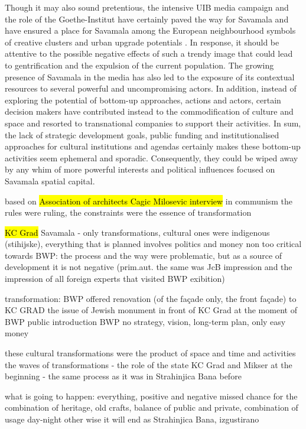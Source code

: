 \documentclass[11pt]{report}
\begin{document}
Though it may also sound pretentious, the intensive UIB media campaign  and the role of the Goethe-Institut have certainly paved the way for Savamala and have ensured a place for Savamala among the European neighbourhood symbols of creative clusters and urban upgrade potentials . In response, it should be attentive to the possible negative effects of such a trendy image that could lead to gentrification and the expulsion of the current population. The growing presence of Savamala in the media has also led to the exposure of its contextual resources to several powerful and uncompromising actors. In addition, instead of exploring the potential of bottom-up approaches, actions and actors, certain decision makers have contributed instead to the commodification of culture and space and resorted to transnational companies  to support their activities. In sum, the lack of strategic development goals, public funding and institutionalised approaches for cultural institutions and agendas certainly makes these bottom-up activities seem ephemeral and sporadic. Consequently, they could be wiped away by any whim of more powerful interests and political influences focused on Savamala spatial capital.

based on \hl{Association of architects Cagic Milosevic interview}
in communism the rules were ruling, the constraints were the essence of transformation

\hl{KC Grad}
Savamala - only transformations, cultural ones were indigenous (stihijske), everything that is planned involves politics and money
non too critical towards BWP: the process and the way were problematic, but as a source of development it is not negative (prim.aut. the same was JcB impression and the impression of all foreign experts that visited BWP exibition)

transformation: BWP offered renovation (of the façade only, the front façade) to KC GRAD
the issue of Jewish monument in front of KC Grad at the moment of BWP public  introduction
BWP no strategy, vision, long-term plan, only easy money

these cultural transformations were the product of space and time and activities
the waves of transformations -  the role of the state
KC Grad and Mikser at the beginning - the same process as it was in Strahinjica Bana before

what is going to happen: everything, positive and negative
missed chance for the combination of heritage, old crafts, balance of public and private, combination of usage day-night
other wise it will end as Strahinjica Bana, izgustirano
\end{document}
